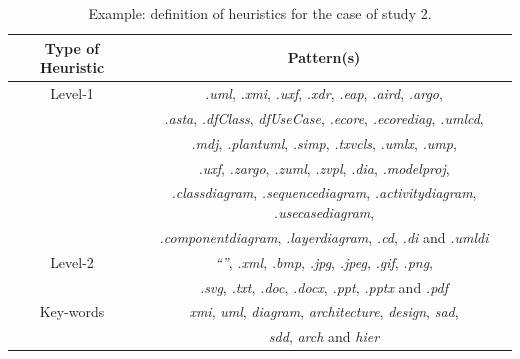 \documentclass[a4paper, 12pt]{book}
\begin{document}
\begin{table}[]
\centering
\caption{Example: definition of heuristics for the case of study 2.}
\label{table:heuristics-cs2-example}
\begin{tabular}{|c|c|}
\hline
\textbf{Type of Heuristic} & \textbf{Pattern(s)}                                                                                           \\ \hline
Level-1                    & \textit{.uml}, \textit{.xmi}, \textit{.uxf}, \textit{.xdr}, \textit{.eap}, \textit{.aird}, \textit{.argo},    \\
                           & \textit{.asta}, \textit{.dfClass}, \textit{dfUseCase}, \textit{.ecore}, \textit{.ecorediag}, \textit{.umlcd}, \\
                           & \textit{.mdj}, \textit{.plantuml}, \textit{.simp}, \textit{.txvcls}, \textit{.umlx}, \textit{.ump},           \\
                           & \textit{.uxf}, \textit{.zargo}, \textit{.zuml}, \textit{.zvpl}, \textit{.dia}, \textit{.modelproj},           \\
                           & \textit{.classdiagram}, \textit{.sequencediagram}, \textit{.activitydiagram}, \textit{.usecasediagram},       \\
                           & \textit{.componentdiagram}, \textit{.layerdiagram}, \textit{.cd}, \textit{.di} and \textit{.umldi}            \\ \hline
Level-2                    & \textit{``''}, \textit{.xml}, \textit{.bmp}, \textit{.jpg}, \textit{.jpeg}, \textit{.gif}, \textit{.png},     \\
                           & \textit{.svg}, \textit{.txt}, \textit{.doc}, \textit{.docx}, \textit{.ppt}, \textit{.pptx} and \textit{.pdf}  \\ \hline
Key-words                  & \textit{xmi}, \textit{uml}, \textit{diagram}, \textit{architecture}, \textit{design}, \textit{sad},           \\
                           & \textit{sdd}, \textit{arch} and  \textit{hier}                                                                \\ \hline
\end{tabular}
\end{table}
\cleardoublepage
\end{document}
